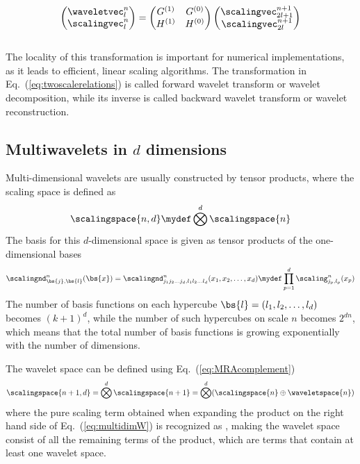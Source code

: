 \begin{equation}
    \label{eq:twoscalerelations}
    \begin{pmatrix}
	\waveletvec_{l}^{n}\\
	\scalingvec_{l}^{n}\\
    \end{pmatrix}=
    \begin{pmatrix}
	G^{(1)}&G^{(0)}\\
	H^{(1)}&H^{(0)}\\
    \end{pmatrix}
    \begin{pmatrix}
	\scalingvec_{2l+1}^{n+1}\\
	\scalingvec_{2l}^{n+1}\\
    \end{pmatrix}
\end{equation}
\\
\noindent
The locality of this transformation is important for numerical implementations,
as it leads to efficient, linear scaling algorithms. The transformation in 
Eq.~(\ref{eq:twoscalerelations}) is called forward wavelet transform or 
wavelet decomposition, while its inverse is called backward wavelet transform
or wavelet reconstruction.

\subsection{Multiwavelets in $d$ dimensions}
Multi-dimensional wavelets are usually constructed by tensor products, where the
scaling space is defined as
\begin{equation}
    \scalingspace{n,d} \mydef \bigotimes^d \scalingspace{n}
\end{equation}
The basis for this $d$-dimensional space is given as tensor products of the
one-dimensional bases
\begin{equation}
    \label{eq:multidimscaling}
    \scalingnd^n_{\bs{j},\bs{l}}(\bs{x}) = 
    \scalingnd^n_{j_1 j_2\dots j_d,l_1 l_2\dots l_d} (x_1,x_2,\dots,x_d) \mydef
    \prod_{p=1}^d \scaling^n_{j_p,l_p}(x_p)
\end{equation}
The number of basis functions on each hypercube $\bs{l}=(l_1,l_2,\dots,l_d)$ 
becomes $(k+1)^d$, while the number of such hypercubes on scale $n$ becomes $2^{dn}$, 
which means that the total number of basis functions is growing exponentially 
with the number of dimensions.

The wavelet space can be defined using Eq.~(\ref{eq:MRAcomplement})
\begin{equation}
    \label{eq:multidimW}
    \scalingspace{n+1,d} = \bigotimes^d \scalingspace{n+1} = 
	\bigotimes^d (\scalingspace{n} \oplus \waveletspace{n})
\end{equation}
where the pure scaling term obtained when expanding the product on the right
hand side of Eq.~(\ref{eq:multidimW}) is recognized as , making the
wavelet space  consist of all the remaining terms of the product, 
which are terms that contain at least one wavelet space.

